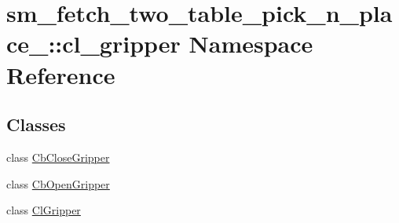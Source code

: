 \hypertarget{namespacesm__fetch__two__table__pick__n__place__1_1_1cl__gripper}{}\section{sm\+\_\+fetch\+\_\+two\+\_\+table\+\_\+pick\+\_\+n\+\_\+place\+\_\+:\+:cl\+\_\+gripper Namespace Reference}
\label{namespacesm__fetch__two__table__pick__n__place__1_1_1cl__gripper}
\subsection*{Classes}
\begin{DoxyCompactItemize}
\item 
class \hyperlink{classsm__fetch__two__table__pick__n__place__1_1_1cl__gripper_1_1CbCloseGripper}{Cb\+Close\+Gripper}
\item 
class \hyperlink{classsm__fetch__two__table__pick__n__place__1_1_1cl__gripper_1_1CbOpenGripper}{Cb\+Open\+Gripper}
\item 
class \hyperlink{classsm__fetch__two__table__pick__n__place__1_1_1cl__gripper_1_1ClGripper}{Cl\+Gripper}
\end{DoxyCompactItemize}
